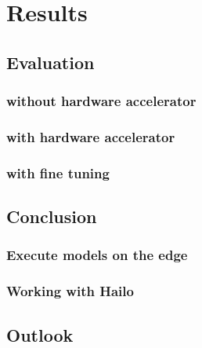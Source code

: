 \chapter{Results}

\section{Evaluation}

\subsection{without hardware accelerator}

\subsection{with hardware accelerator}

\subsection{with fine tuning}

\section{Conclusion}

\subsection{Execute models on the edge}

\subsection{Working with Hailo}

\section{Outlook}
